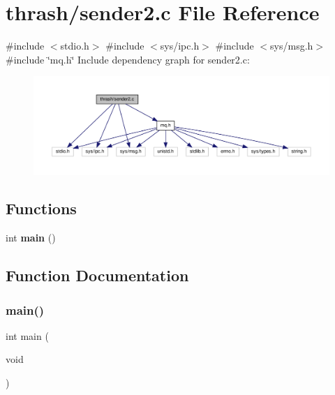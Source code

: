 \section{thrash/sender2.c File Reference}
\label{sender2_8c}
{\ttfamily \#include $<$stdio.\+h$>$}\newline
{\ttfamily \#include $<$sys/ipc.\+h$>$}\newline
{\ttfamily \#include $<$sys/msg.\+h$>$}\newline
{\ttfamily \#include \char`\"{}mq.\+h\char`\"{}}\newline
Include dependency graph for sender2.\+c\+:
\nopagebreak
\begin{figure}[H]
\begin{center}
\leavevmode
\includegraphics[width=350pt]{sender2_8c__incl}
\end{center}
\end{figure}
\subsection*{Functions}
\begin{DoxyCompactItemize}
\item 
int \textbf{ main} ()
\end{DoxyCompactItemize}


\subsection{Function Documentation}
\mbox{\label{sender2_8c_ae66f6b31b5ad750f1fe042a706a4e3d4}} 
\subsubsection{main()}
{\footnotesize\ttfamily int main (\begin{DoxyParamCaption}\item[{void}]{ }\end{DoxyParamCaption})}

